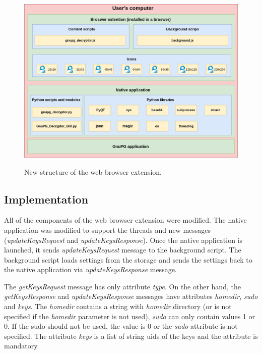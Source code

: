 \begin{figure}[H]
    \begin{center}
        \label{img:finalProductAnatomy}
        \includegraphics[width=1.0\textwidth]{obrazky-figures/final-product-schema.png}
        \caption{New structure of the web browser extension.}
    \end{center}
\end{figure}

\subsection{Implementation}
All of the components of the web browser extension were modified. The native application was modified to support the threads and new messages (\textit{updateKeysRequest} and \textit{updateKeysResponse}). Once the native application is launched, it sends \textit{updateKeysRequest} message to the background script. The background script loads settings from the storage and sends the settings back to the native application via \textit{updateKeysResponse} message.

The \textit{getKeysRequest} message has only attribute \textit{type}. On the other hand, the \textit{getKeysResponse} and \textit{updateKeysResponse} messages have attributes \textit{homedir}, \textit{sudo} and \textit{keys}. The \textit{homedir} contains a string with \textit{homedir} directory (or is not specified if the \textit{homedir} parameter is not used), \textit{sudo} can only contain values 1 or 0. If the sudo should not be used, the value is 0 or the \textit{sudo} attribute is not specified. The attribute \textit{keys} is a list of string uids of the keys and the attribute is mandatory.

